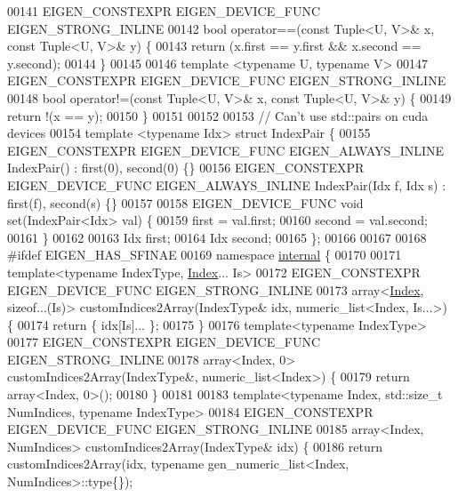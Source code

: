\begin{DoxyCode}
00141 EIGEN\_CONSTEXPR EIGEN\_DEVICE\_FUNC EIGEN\_STRONG\_INLINE
00142 \textcolor{keywordtype}{bool} operator==(\textcolor{keyword}{const} Tuple<U, V>& x, \textcolor{keyword}{const} Tuple<U, V>& y) \{
00143   \textcolor{keywordflow}{return} (x.first == y.first && x.second == y.second);
00144 \}
00145 
00146 \textcolor{keyword}{template} <\textcolor{keyword}{typename} U, \textcolor{keyword}{typename} V>
00147 EIGEN\_CONSTEXPR EIGEN\_DEVICE\_FUNC EIGEN\_STRONG\_INLINE
00148 \textcolor{keywordtype}{bool} operator!=(\textcolor{keyword}{const} Tuple<U, V>& x, \textcolor{keyword}{const} Tuple<U, V>& y) \{
00149   \textcolor{keywordflow}{return} !(x == y);
00150 \}
00151 
00152 
00153 \textcolor{comment}{// Can't use std::pairs on cuda devices}
00154 \textcolor{keyword}{template} <\textcolor{keyword}{typename} Idx> \textcolor{keyword}{struct }IndexPair \{
00155   EIGEN\_CONSTEXPR EIGEN\_DEVICE\_FUNC EIGEN\_ALWAYS\_INLINE IndexPair() : first(0), second(0) \{\}
00156   EIGEN\_CONSTEXPR EIGEN\_DEVICE\_FUNC EIGEN\_ALWAYS\_INLINE IndexPair(Idx f, Idx s) : first(f), second(s) \{\}
00157 
00158   EIGEN\_DEVICE\_FUNC \textcolor{keywordtype}{void} \textcolor{keyword}{set}(IndexPair<Idx> val) \{
00159     first = val.first;
00160     second = val.second;
00161   \}
00162 
00163   Idx first;
00164   Idx second;
00165 \};
00166 
00167 
00168 \textcolor{preprocessor}{#ifdef EIGEN\_HAS\_SFINAE}
00169 \textcolor{keyword}{namespace }\hyperlink{namespaceinternal}{internal} \{
00170 
00171   \textcolor{keyword}{template}<\textcolor{keyword}{typename} IndexType, \hyperlink{namespace_eigen_a62e77e0933482dafde8fe197d9a2cfde}{Index}... Is>
00172   EIGEN\_CONSTEXPR EIGEN\_DEVICE\_FUNC EIGEN\_STRONG\_INLINE
00173   array<\hyperlink{namespace_eigen_a62e77e0933482dafde8fe197d9a2cfde}{Index}, \textcolor{keyword}{sizeof}...(Is)> customIndices2Array(IndexType& idx, numeric\_list<Index, Is...>) \{
00174     \textcolor{keywordflow}{return} \{ idx[Is]... \};
00175   \}
00176   \textcolor{keyword}{template}<\textcolor{keyword}{typename} IndexType>
00177   EIGEN\_CONSTEXPR EIGEN\_DEVICE\_FUNC EIGEN\_STRONG\_INLINE
00178   array<Index, 0> customIndices2Array(IndexType&, numeric\_list<Index>) \{
00179     \textcolor{keywordflow}{return} array<Index, 0>();
00180   \}
00181 
00183   \textcolor{keyword}{template}<\textcolor{keyword}{typename} Index, std::\textcolor{keywordtype}{size\_t} NumIndices, \textcolor{keyword}{typename} IndexType>
00184   EIGEN\_CONSTEXPR EIGEN\_DEVICE\_FUNC EIGEN\_STRONG\_INLINE
00185   array<Index, NumIndices> customIndices2Array(IndexType& idx) \{
00186     \textcolor{keywordflow}{return} customIndices2Array(idx, \textcolor{keyword}{typename} gen\_numeric\_list<Index, NumIndices>::type\{\});

\end{DoxyCode}
